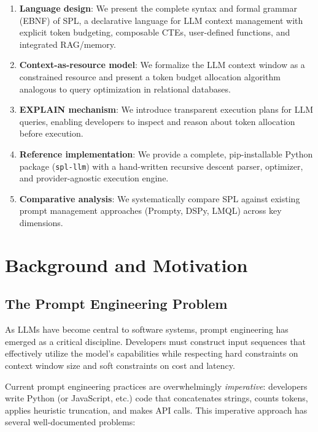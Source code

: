 \documentclass[11pt,a4paper]{article}
\begin{document}
\begin{enumerate}[nosep]
  \item \textbf{Language design}: We present the complete syntax and formal grammar (EBNF) of SPL, a declarative language for LLM context management with explicit token budgeting, composable CTEs, user-defined functions, and integrated RAG/memory.
  \item \textbf{Context-as-resource model}: We formalize the LLM context window as a constrained resource and present a token budget allocation algorithm analogous to query optimization in relational databases.
  \item \textbf{EXPLAIN mechanism}: We introduce transparent execution plans for LLM queries, enabling developers to inspect and reason about token allocation before execution.
  \item \textbf{Reference implementation}: We provide a complete, pip-installable Python package (\texttt{spl-llm}) with a hand-written recursive descent parser, optimizer, and provider-agnostic execution engine.
  \item \textbf{Comparative analysis}: We systematically compare SPL against existing prompt management approaches (Prompty, DSPy, LMQL) across key dimensions.
\end{enumerate}

\section{Background and Motivation}
\label{sec:background}

\subsection{The Prompt Engineering Problem}

As LLMs have become central to software systems, prompt engineering has emerged as a critical discipline. Developers must construct input sequences that effectively utilize the model's capabilities while respecting hard constraints on context window size and soft constraints on cost and latency.

Current prompt engineering practices are overwhelmingly \emph{imperative}: developers write Python (or JavaScript, etc.) code that concatenates strings, counts tokens, applies heuristic truncation, and makes API calls. This imperative approach has several well-documented problems:
\end{document}
